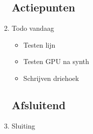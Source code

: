 \documentclass{article}
\begin{document}
\begin{enumerate}
	\subsection*{Actiepunten}
	\item Todo vandaag
	\begin{itemize}
		\item Testen lijn
		\item Testen GPU na synth
		\item Schrijven driehoek
	\end{itemize}

	\noindent 
	\subsection*{Afsluitend}
	\item Sluiting

\end{enumerate}
\end{document}
